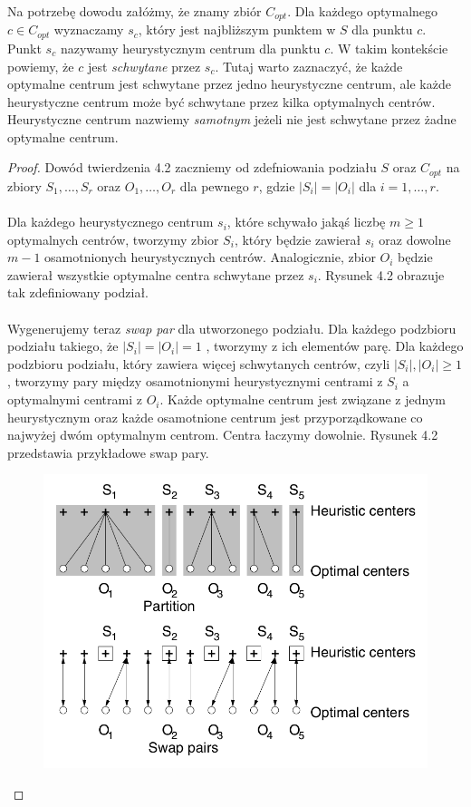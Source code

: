\noindent
Na potrzebę dowodu załóżmy, że znamy zbiór $C_{opt}$.
Dla każdego optymalnego $c \in C_{opt}$ wyznaczamy $s_{c}$, który jest najbliższym punktem w $S$ dla punktu $c$.
Punkt $s_{c}$ nazywamy heurystycznym centrum dla punktu $c$.
W takim kontekście powiemy, że $c$ jest \textit{schwytane} przez $s_{c}$.
Tutaj warto zaznaczyć, że każde optymalne centrum jest schwytane przez jedno heurystyczne centrum, ale każde heurystyczne centrum może być schwytane przez kilka optymalnych centrów.
Heurystyczne centrum nazwiemy \textit{samotnym} jeżeli nie jest schwytane przez żadne optymalne centrum.

\begin{proof}
    Dowód twierdzenia 4.2 zaczniemy od zdefniowania podziału $S$ oraz $C_{opt}$ na zbiory $S_{1}, \dots, S_{r}$ oraz $O_{1}, \dots, O_{r}$ dla pewnego $r$, gdzie $|S_{i}| = |O_{i}|$ dla $i = 1, \dots, r$.
    \\~\\
    Dla każdego heurystycznego centrum $s_{i}$, które schywało jakąś liczbę $m \geq 1$ optymalnych centrów, tworzymy zbior $S_{i}$, który będzie zawierał $s_{i}$ oraz dowolne $m-1$ osamotnionych heurystycznych centrów.
    Analogicznie, zbior $O_{i}$ będzie zawierał wszystkie optymalne centra schwytane przez $s_{i}$.
    Rysunek 4.2 obrazuje tak zdefiniowany podział.
    \\~\\
    \noindent
    Wygenerujemy teraz \textit{swap par} dla utworzonego podziału.
    Dla każdego podzbioru podziału takiego, że $|S_{i}| = |O_{i}| = 1$ , tworzymy z ich elementów parę.
    Dla każdego podzbioru podziału, który zawiera więcej schwytanych centrów, czyli $|S_{i}|, |O_{i}| \geq 1$, tworzymy pary między osamotnionymi heurystycznymi centrami z $S_{i}$ a optymalnymi centrami z $O_{i}$.
    Każde optymalne centrum jest związane z jednym heurystycznym oraz każde osamotnione centrum jest przyporządkowane co najwyżej dwóm optymalnym centrom.
    Centra łaczymy dowolnie. 
    Rysunek 4.2 przedstawia przykładowe swap pary.
    \begin{figure}[H]
        \centering
        \includegraphics[totalheight=8cm]{swap.png}

\end{figure}
\end{proof}
